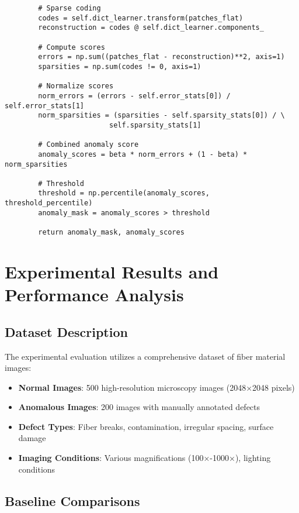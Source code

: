 \documentclass[12pt]{article}
\begin{document}
\begin{verbatim}
        # Sparse coding
        codes = self.dict_learner.transform(patches_flat)
        reconstruction = codes @ self.dict_learner.components_
        
        # Compute scores
        errors = np.sum((patches_flat - reconstruction)**2, axis=1)
        sparsities = np.sum(codes != 0, axis=1)
        
        # Normalize scores
        norm_errors = (errors - self.error_stats[0]) / self.error_stats[1]
        norm_sparsities = (sparsities - self.sparsity_stats[0]) / \
                         self.sparsity_stats[1]
        
        # Combined anomaly score
        anomaly_scores = beta * norm_errors + (1 - beta) * norm_sparsities
        
        # Threshold
        threshold = np.percentile(anomaly_scores, threshold_percentile)
        anomaly_mask = anomaly_scores > threshold
        
        return anomaly_mask, anomaly_scores
\end{verbatim}

\section{Experimental Results and Performance Analysis}
\label{app:experiments}

\subsection{Dataset Description}
\label{app:dataset}

The experimental evaluation utilizes a comprehensive dataset of fiber material images:

\begin{itemize}[leftmargin=*]
    \item \textbf{Normal Images}: 500 high-resolution microscopy images (2048×2048 pixels)
    \item \textbf{Anomalous Images}: 200 images with manually annotated defects
    \item \textbf{Defect Types}: Fiber breaks, contamination, irregular spacing, surface damage
    \item \textbf{Imaging Conditions}: Various magnifications (100×-1000×), lighting conditions
\end{itemize}

\subsection{Baseline Comparisons}
\label{app:baselines}
\end{document}
